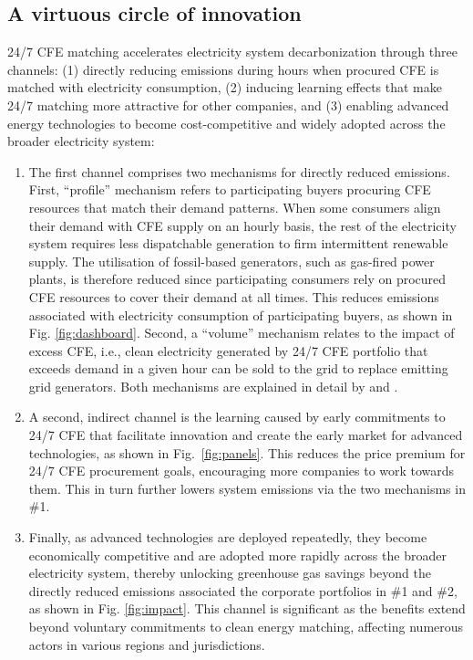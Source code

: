 \documentclass[pdflatex,sn-basic, Numbered]{sn-jnl}
\theoremstyle{thmstyleone}%
\theoremstyle{thmstyletwo}%
\theoremstyle{thmstylethree}%
\begin{document}
\subsection*{A virtuous circle of innovation}\label{sec5}

24/7 CFE matching accelerates electricity system decarbonization through three channels: (1) directly reducing emissions during hours when procured CFE is matched with electricity consumption, (2) inducing learning effects that make 24/7 matching more attractive for other companies, and (3) enabling advanced energy technologies to become cost-competitive and widely adopted across the broader electricity system:

\begin{enumerate}
    \item The first channel comprises two mechanisms for directly reduced emissions. First, \enquote{profile} mechanism refers to participating buyers procuring CFE resources that match their demand patterns. When some consumers align their demand with CFE supply on an hourly basis, the rest of the electricity system requires less dispatchable generation to firm intermittent renewable supply. The utilisation of fossil-based generators, such as gas-fired power plants, is therefore reduced since participating consumers rely on procured CFE resources to cover their demand at all times. This reduces emissions associated with electricity consumption of participating buyers, as shown in Fig. \ref{fig:dashboard}.
    Second, a \enquote{volume} mechanism relates to the impact of excess CFE, i.e., clean electricity generated by 24/7 CFE portfolio that exceeds demand in a given hour can be sold to the grid to replace emitting grid generators. Both mechanisms are explained in detail by \citet{xu-247CFE-report} and \citet{riepinMeansCostsSystemlevel2024}.
    \item A second, indirect channel is the learning caused by early commitments to 24/7 CFE that facilitate innovation and create the early market for advanced technologies, as shown in Fig.~\ref{fig:panels}.
    This reduces the price premium for 24/7 CFE procurement goals, encouraging more companies to work towards them. This in turn further lowers system emissions via the two mechanisms in \#1.
    \item Finally, as advanced technologies are deployed repeatedly, they become economically competitive and are adopted more rapidly across the broader electricity system, thereby unlocking greenhouse gas savings beyond the directly reduced emissions associated the corporate portfolios in \#1 and \#2, as shown in Fig. \ref{fig:impact}. This channel is significant as the benefits extend beyond voluntary commitments to clean energy matching, affecting numerous actors in various regions and jurisdictions.
\end{enumerate}
\end{document}

